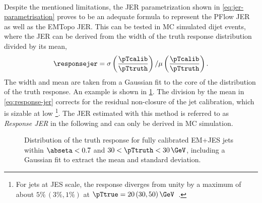 \paragraph{}
Despite the mentioned limitations, the JER parametrization shown in \cref{eq:jer-parametrisation} proves to be an adequate formula to represent the PFlow JER as well as the EMTopo JER.
This can be tested in MC simulated dijet events, where the JER can be derived from the width of the truth response distribution divided by its mean,
\begin{equation}
    \label{eq:response-jer}
    \responsejer = \sigma \left( \frac{\pTcalib}{\pTtruth} \right) / \mu \left( \frac{\pTcalib}{\pTtruth} \right).
\end{equation}
The width and mean are taken from a Gaussian fit to the core of the distribution of the truth response. An example is shown in \cref{fig:truth-response}. The division by the mean in \cref{eq:response-jer} corrects for the residual non-closure of the jet calibration, which is sizable at low \pT\footnote{For jets at JES scale, the response diverges from unity by a maximum of about $5\%\,(3\%, 1\%)$ at $\pTtrue = 20\,(30, 50)\,\GeV$~\cite{JETM-2018-05}.}. 
The JER estimated with this method is referred to as \emph{Response JER} in the following and can only be derived in MC simulation.

\begin{figure}[t]
    \caption[Distribution of the truth response for fully calibrated EM+JES jets.]{Distribution of the truth response for fully calibrated EM+JES jets within $\abseta < 0.7$ and $30 < \pTtruth < 30\,\GeV$, including a Gaussian fit to extract the mean and standard deviation.}
    \label{fig:truth-response}
\end{figure}

